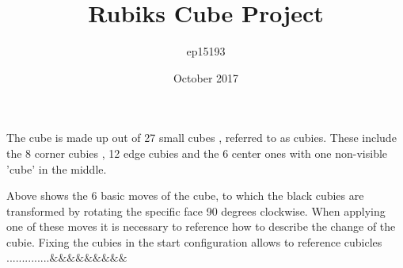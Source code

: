 \documentclass{article}
\author{ep15193}
\title{Rubiks Cube Project}\vspace{-50pt}
\date{October 2017}
\begin{document}
\maketitle


\medskip
The cube is made up out of 27 small cubes , referred to as cubies. These include the 8 corner cubies , 12 edge cubies and the 6 center ones with one non-visible 'cube' in the middle.
\vspace{-20pt}
\begin{figure}[h]
{
	\hspace{-10cm}
}
\end{figure}
\begin{figure}[h]
{
}
\end{figure}
\vspace{20pt}
\newline Above shows the 6 basic moves of the cube, to which the black cubies are transformed by rotating the specific face 90 degrees clockwise.  When applying one of these moves it is necessary to reference how to describe the change of the cubie. Fixing the cubies in the start configuration allows to reference cubicles ..............$\&\&\&\&\&\&\&\&\&$
\end{document}
